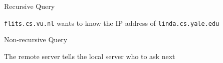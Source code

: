 \begin{frame}{Recursive Query}
  \begin{iblock}{\texttt{flits.cs.vu.nl} wants to know the IP address of
      \texttt{linda.cs.yale.edu}}
    \begin{center}
    \end{center}
  \end{iblock}
\end{frame}

\begin{frame}{Non-recursive Query}
  \begin{iblock}{The remote server tells the local server who to ask next}
    \begin{center}
    \end{center}
    \label{fig:non_recursive}
  \end{iblock}
\end{frame}


